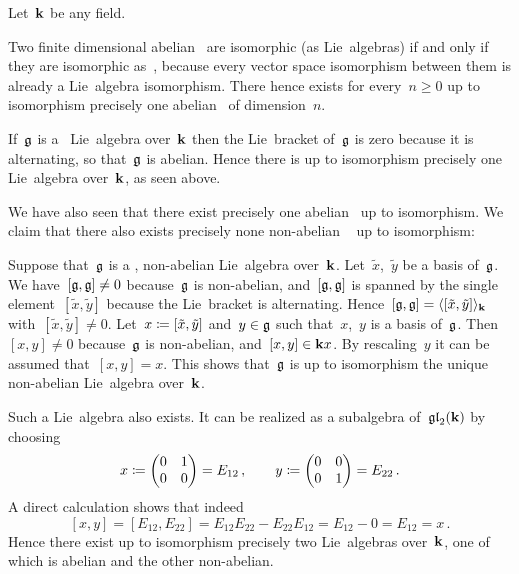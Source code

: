 \begin{example}
  Let~$\kf$ be any field.
  
  Two finite dimensional abelian~{\liealgebras{$\kf$}} are isomorphic (as Lie~algebras) if and only if they are isomorphic as~{\vectorspaces{$\kf$}}, because every vector space isomorphism between them is already a Lie~algebra isomorphism.
  There hence exists for every~$n \geq 0$ up to isomorphism precisely one abelian~{\liealgebra{$\kf$}} of dimension~$n$.
  
  If~$\mathfrak{g}$ is a~{\onedimensional} Lie~algebra over~$\kf$ then the Lie~bracket of~$\mathfrak{g}$ is zero because it is alternating, so that~$\mathfrak{g}$ is abelian.
  Hence there is up to isomorphism precisely one {\onedimensional} Lie~algebra over~$\kf$, as seen above.
  
  We have also seen that there exist precisely one {\twodimensional} abelian~{\liealgebra{$\kf$}} up to isomorphism.
  We claim that there also exists precisely none non-abelian {\twodimensional}~{\liealgebra{$\kf$}} up to isomorphism:
  
  Suppose that~$\mathfrak{g}$ is a {\twodimensional}, non-abelian Lie~algebra over~$\kf$.
  Let~$\tilde{x}$,~$\tilde{y}$ be a basis of~$\mathfrak{g}$.
  We have~$[\mathfrak{g},\mathfrak{g}] \neq 0$ because~$\mathfrak{g}$ is non-abelian, and~$[\mathfrak{g}, \mathfrak{g}]$ is spanned by the single element~$[\tilde{x}, \tilde{y}]$ because the Lie~bracket is alternating.
  Hence~$[\mathfrak{g}, \mathfrak{g}] = \langle [\tilde{x}, \tilde{y}] \rangle_{\mathbf{k}}$ with~$[\tilde{x}, \tilde{y}] \neq 0$.
  Let~$x \coloneqq [\tilde{x},\tilde{y}]$ and~$y \in \mathfrak{g}$ such that~$x$,~$y$ is a basis of~$\mathfrak{g}$.
  Then~$[x,y] \neq 0$ because~$\mathfrak{g}$ is non-abelian, and~$[x,y] \in \mathbf{k} x$.
  By rescaling~$y$ it can be assumed that~$[x,y] = x$.
 This shows that~$\mathfrak{g}$ is up to isomorphism the unique {\twodimensional} non-abelian Lie~algebra over~$\kf$.
 
  Such a Lie~algebra also exists.
  It can be realized as a subalgebra of~$\mathfrak{gl}_2(\mathbf{k})$ by choosing
  \[
    x
    \coloneqq
    \begin{pmatrix}
      0 & 1 \\
      0 & 0
    \end{pmatrix}
    =
    E_{12}  \,,
    \qquad
    y
    \coloneqq
    \begin{pmatrix}
      0 & 0 \\
      0 & 1
    \end{pmatrix}
    =
    E_{22}  \,.
  \]
  A direct calculation shows that indeed
  \[
    [x,y]
    =
    [E_{12}, E_{22}]
    =
    E_{12} E_{22} - E_{22} E_{12}
    =
    E_{12} - 0
    =
    E_{12}
    =
    x \,.
  \]
  Hence there exist up to isomorphism precisely two {\twodimensional} Lie~algebras over~$\kf$, one of which is abelian and the other non-abelian.
\end{example}

